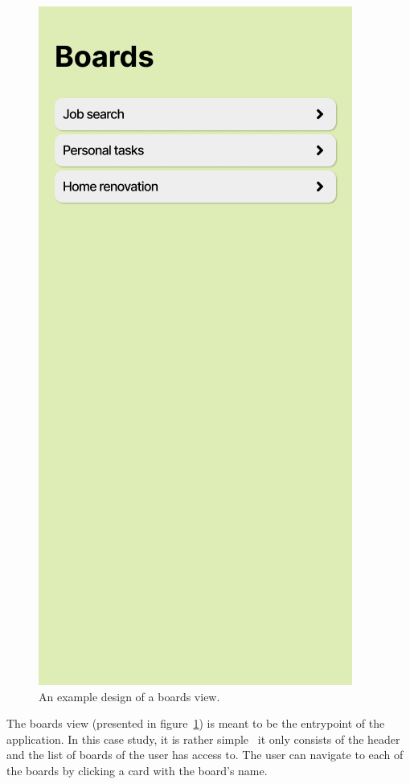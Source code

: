 \begin{figure}
    \centering
    \includegraphics[height=0.4\textheight]{./3-research-methodology/boards-view}
    \caption{An example design of a boards view.}
    \label{fig:3-4-boards-view}
\end{figure}

The boards view (presented in figure~\ref{fig:3-4-boards-view}) is meant to be the entrypoint of the application.
In this case study, it is rather simple \textendash\ it only consists of the header and the list of boards of the user has access to.
The user can navigate to each of the boards by clicking a card with the board's name.

